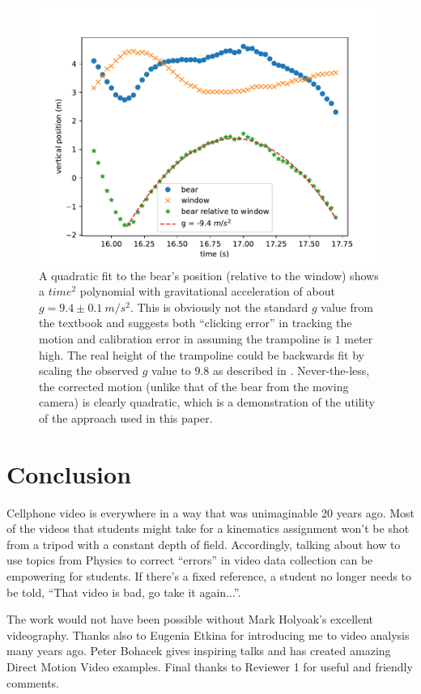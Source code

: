 \documentclass[12pt]{iopart}
\begin{document}
\begin{figure}[h]
\centering
\includegraphics[width=\columnwidth]{figure_8_bear-quadratic.pdf}
\caption{
A quadratic fit to the bear's position (relative to the window) shows a $time^2$ polynomial with gravitational acceleration of about $g=9.4\pm 0.1~m/s^2$.  This is obviously not the standard $g$ value from the textbook and suggests both ``clicking error'' in tracking the motion and calibration error in assuming the trampoline is $1$ meter high. The real height of the trampoline could be backwards fit by scaling the observed $g$ value to $9.8$ as described in \cite{backwards_fit}. 
Never-the-less, the corrected motion (unlike that of the bear from the moving camera) is clearly quadratic, which is a demonstration of the utility of the approach used in this paper.
}
\label{bear-quadratic}
\end{figure}

\section{Conclusion}
Cellphone video is everywhere in a way that was unimaginable 20 years ago.  Most of the videos that students might take for a kinematics assignment won't be shot from a tripod with a constant depth of field.  Accordingly, talking about how to use topics from Physics to correct ``errors'' in video data collection can be empowering for students.  If there's a fixed reference, a student no longer needs to be told, ``That video is bad, go take it again...''.

\ack
The work would not have been possible without Mark Holyoak's excellent videography.  Thanks also to Eugenia Etkina for introducing me to video analysis many years ago.  Peter Bohacek gives inspiring talks and has created amazing Direct Motion Video examples.  Final thanks to Reviewer 1 for useful and friendly comments.
\end{document}
